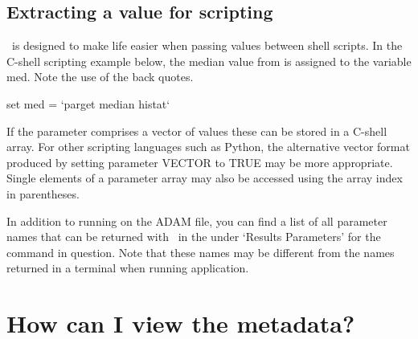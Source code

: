 \documentclass[11pt,oneside,chapters]{starlink}
\begin{document}
\subsection{Extracting a value for scripting}

\parget\ is designed to make life easier when passing values between
shell scripts. In the C-shell scripting example below, the median
value from  is assigned to the variable med.  Note the
use of the back quotes.

\begin{terminalv}
set med = `parget median histat`
\end{terminalv}

If the parameter comprises a vector of values these can be stored in a
C-shell array. For other scripting languages such as Python, the
alternative vector format produced by setting parameter VECTOR to TRUE
may be more appropriate. Single elements of a parameter array may also
be accessed using the array index in parentheses.

In addition to running  on the ADAM file, you can find
a list of all parameter names that can be returned with \parget\ in
the  under `Results Parameters'
for the command in question. Note that these names may be different
from the names returned in a terminal when running application.

\section{How can I view the metadata?}
\label{sec:fitslist}
\end{document}
